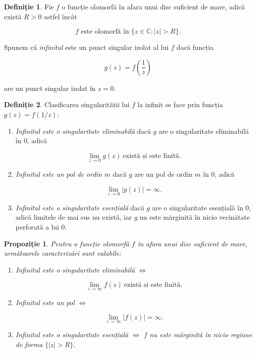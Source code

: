 \documentclass[12pt]{article}
\theoremstyle{definition}
\newtheorem{definition}{Definiție}
\theoremstyle{plain}
\newtheorem{proposition}{Propoziție}
\begin{document}
\begin{definition}
Fie $f$ o funcție olomorfă în afara unui disc suficient de mare, adică există $R > 0$ astfel încât


\[
f \text{ este olomorfă în } \{ z \in \mathbb{C} : |z| > R \}.
\]


Spunem că \emph{infinitul} este un punct singular izolat al lui $f$ dacă funcția


\[
g(z) = f\!\left(\frac{1}{z}\right)
\]


are un punct singular izolat în $z = 0$.
\end{definition}

\begin{definition}
Clasificarea singularității lui $f$ la infinit se face prin funcția $g(z) = f(1/z)$:
\begin{enumerate}
    \item[(i)] \emph{Infinitul este o singularitate eliminabilă} dacă $g$ are o singularitate eliminabilă în $0$, adică
    

\[
    \lim_{z \to 0} g(z) \ \text{există și este finită}.
    \]



    \item[(ii)] \emph{Infinitul este un pol de ordin $m$} dacă $g$ are un pol de ordin $m$ în $0$, adică
    

\[
    \lim_{z \to 0} |g(z)| = \infty.
    \]



    \item[(iii)] \emph{Infinitul este o singularitate esențială} dacă $g$ are o singularitate esențială în $0$, adică
    limitele de mai sus nu există, iar $g$ nu este mărginită în nicio vecinătate perforată a lui $0$.
\end{enumerate}
\end{definition}

\begin{proposition}
Pentru o funcție olomorfă $f$ în afara unui disc suficient de mare, următoarele caracterizări sunt valabile:
\begin{enumerate}
    \item[(i)] Infinitul este o singularitate eliminabilă $\Longleftrightarrow$
    

\[
    \lim_{z \to \infty} f(z) \ \text{există și este finită}.
    \]



    \item[(ii)] Infinitul este un pol $\Longleftrightarrow$
    

\[
    \lim_{z \to \infty} |f(z)| = \infty.
    \]



    \item[(iii)] Infinitul este o singularitate esențială $\Longleftrightarrow$
    $f$ nu este mărginită în nicio regiune de forma $\{ |z| > R \}$.
\end{enumerate}
\end{proposition}
\end{document}
